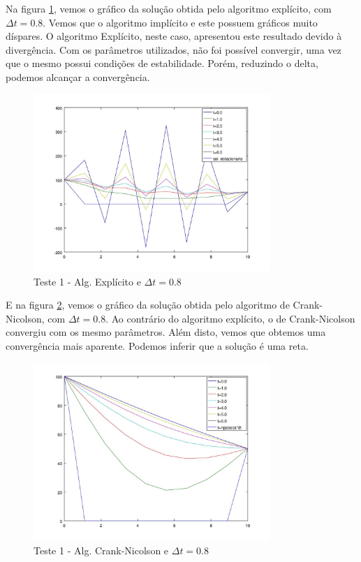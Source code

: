 \documentclass[
	11pt,				%
	oneside,			%
	a4paper,			%
	english,			%
	brazil,				%
	]{article}
\begin{document}
Na figura \ref{fig:t1-exp}, vemos o gráfico da solução obtida pelo 
algoritmo explícito, com $\Delta t = 0.8$. Vemos que o algoritmo implícito e 
este possuem gráficos muito díspares. O algoritmo Explícito, neste caso, 
apresentou este resultado devido à divergência. Com os parâmetros utilizados, 
não foi possível convergir, uma vez que o mesmo possui condições de 
estabilidade. Porém, reduzindo o delta, podemos alcançar a convergência.

\begin{figure}[ht]
    \centering
    \includegraphics[width=0.8\textwidth]{teste1-exp-dt-08}
    \caption{Teste 1 - Alg. Explícito e $\Delta t = 0.8$}
    \label{fig:t1-exp}
\end{figure}

E na figura \ref{fig:t1-crank}, vemos o gráfico da solução obtida pelo 
algoritmo de Crank-Nicolson, com $\Delta t = 0.8$. Ao contrário do algoritmo 
explícito, o de Crank-Nicolson convergiu com os mesmo parâmetros. Além disto, 
vemos que obtemos uma convergência mais aparente. Podemos inferir que a solução 
é uma reta.

\begin{figure}[ht]
    \centering
    \includegraphics[width=0.8\textwidth]{teste1-crank-dt-08}
    \caption{Teste 1 - Alg. Crank-Nicolson e $\Delta t = 0.8$}
    \label{fig:t1-crank}
\end{figure}
\end{document}
